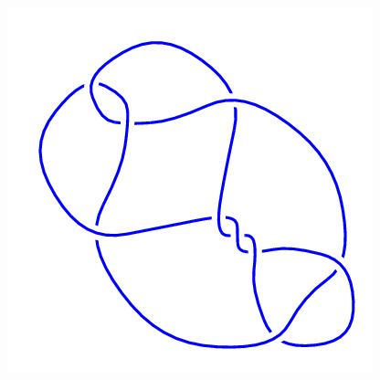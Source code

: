 \begin{figure}[H]
\begin{minipage}[b]{.18\linewidth}
    \end{minipage}
    \begin{minipage}[b]{.18\linewidth}
        \centering
        \includegraphics[width=\linewidth]{../data/9_15.png}
    \end{minipage}
\end{figure}
